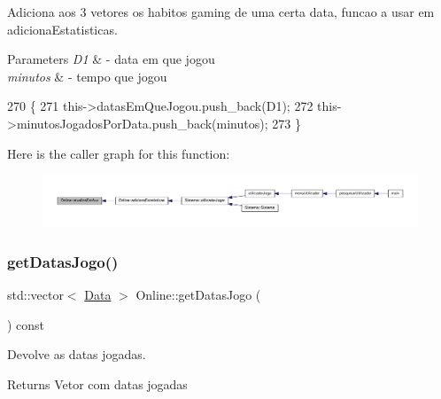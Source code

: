 Adiciona aos 3 vetores os habitos gaming de uma certa data, funcao a usar em adiciona\+Estatisticas. 


\begin{DoxyParams}{Parameters}
{\em D1} & -\/ data em que jogou \\
\hline
{\em minutos} & -\/ tempo que jogou \\
\hline
\end{DoxyParams}

\begin{DoxyCode}
270                                                                   \{
271     this->datasEmQueJogou.push\_back(D1);
272     this->minutosJogadosPorData.push\_back(minutos);
273  \}
\end{DoxyCode}
Here is the caller graph for this function\+:
\nopagebreak
\begin{figure}[H]
\begin{center}
\leavevmode
\includegraphics[width=350pt]{classOnline_a1796bfbb1c3210f26ca8e1cddc61d830_icgraph}
\end{center}
\end{figure}
\mbox{\label{classOnline_aa6f51a948cb5ffd2c7cbac1f1cd6023f}} 
\subsubsection{\texorpdfstring{get\+Datas\+Jogo()}{getDatasJogo()}}
{\footnotesize\ttfamily std\+::vector$<$ \hyperlink{classData}{Data} $>$ Online\+::get\+Datas\+Jogo (\begin{DoxyParamCaption}{ }\end{DoxyParamCaption}) const}



Devolve as datas jogadas. 

\begin{DoxyReturn}{Returns}
Vetor com datas jogadas 
\end{DoxyReturn}


